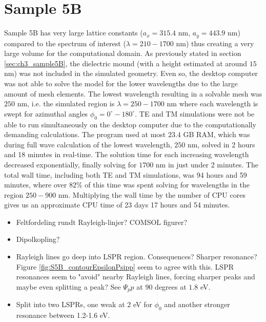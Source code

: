 \clearpage
\section{Sample 5B}
Sample 5B has very large lattice constants ($a_x=315.4$ nm, $a_y=443.9$ nm) compared to the spectrum of interest ($\lambda=210-1700$ nm) thus creating a very large volume for the computational domain. As previously stated in section \ref{sec:ch3_sample5B}, the dielectric mound (with a height estimated at around $15$ nm) was not included in the simulated geometry. Even so, the desktop computer was not able to solve the model for the lower wavelengths due to the large amount of mesh elements. The lowest wavelength resulting in a solvable mesh was $250$ nm, i.e. the simulated region is $\lambda=250-1700$ nm where each wavelength is swept for azimuthal angles $\phi_0=0^\circ-180^\circ$. TE and TM simulations were not be able to run simultaneously on the desktop computer due to the computationally demanding calculations. The program used at most $23.4$ GB RAM, which was during full wave calculation of the lowest wavelength, $250$ nm, solved in 2 hours and 18 minutes in real-time. The solution time for each increasing wavelength decreased exponentially, finally solving for $1700$ nm in just under 2 minutes. The total wall time, including both TE and TM simulations, was 94 hours and 59 minutes, where over $82\%$ of this time was spent solving for wavelengths in the region $250-900$ nm. Multiplying the wall time by the number of CPU cores gives us an approximate CPU time of 23 days 17 hours and 54 minutes. 
\begin{itemize}

    \item Feltfordeling rundt Rayleigh-linjer? COMSOL figurer?
    \item Dipolkopling?
    \item Rayleigh lines go deep into LSPR region. Consequences? Sharper resonance? Figure \ref{fig:S5B_contourEpsilonPsipp} seem to agree with this. LSPR resonances seem to "avoid" nearby Rayleigh lines, forcing sharper peaks and maybe even splitting a peak? See $\Psi_pp$ at $90$ degrees at $1.8$ eV.
    \item Split into two LSPRs, one weak at 2 eV for $\phi_0$ and another stronger resonance between 1.2-1.6 eV.
\end{itemize}

